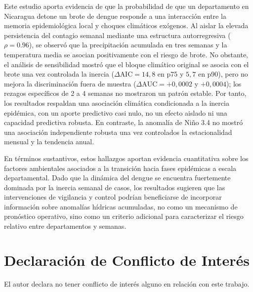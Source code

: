 \documentclass[11pt,a4paper]{article}
\begin{document}
Este estudio aporta evidencia de que la probabilidad de que un departamento en Nicaragua detone un brote de dengue responde a una interacción entre la memoria epidemiológica local y choques climáticos exógenos. Al aislar la elevada persistencia del contagio semanal mediante una estructura autorregresiva ($\rho = 0.96$), se observó que la precipitación acumulada en tres semanas y la temperatura media se asocian positivamente con el riesgo de brote. No obstante, el análisis de sensibilidad mostró que el bloque climático original se asocia con el brote una vez controlada la inercia ($\Delta\text{AIC} = 14{,}8$ en p75 y $5{,}7$ en p90), pero no mejora la discriminación fuera de muestra ($\Delta\text{AUC} = +0{,}0002$ y $+0{,}0004$); los rezagos específicos de 2 a 4 semanas no mostraron un patrón estable. Por tanto, los resultados respaldan una asociación climática condicionada a la inercia epidémica, con un aporte predictivo casi nulo, no un efecto aislado ni una capacidad predictiva robusta. En contraste, la anomalía de Niño 3.4 no mostró una asociación independiente robusta una vez controlados la estacionalidad mensual y la tendencia anual.

\medskip

En términos sustantivos, estos hallazgos aportan evidencia cuantitativa sobre los factores ambientales asociados a la transición hacia fases epidémicas a escala departamental. Dado que la dinámica del dengue se encuentra fuertemente dominada por la inercia semanal de casos, los resultados sugieren que las intervenciones de vigilancia y control podrían beneficiarse de incorporar información sobre anomalías hídricas acumuladas, no como un mecanismo de pronóstico operativo, sino como un criterio adicional para caracterizar el riesgo relativo entre departamentos y semanas.

\newpage

\section*{Declaración de Conflicto de Interés}

El autor declara no tener conflicto de interés alguno en relación con este trabajo.

\printbibliography
\end{document}
